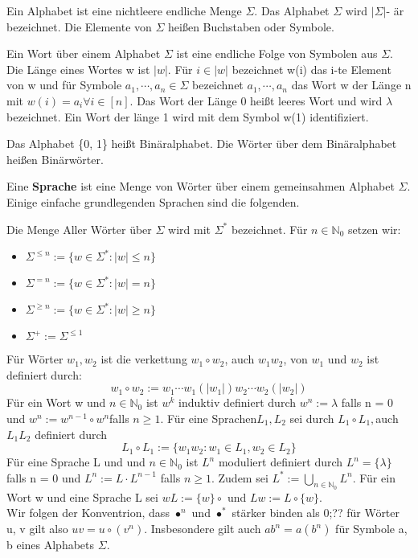     Ein Alphabet ist eine nichtleere endliche Menge \(\Sigma\). Das Alphabet \(\Sigma\) wird \(\lvert \Sigma \rvert\)- är bezeichnet. Die Elemente von \(\Sigma\) heißen Buchstaben oder Symbole.

    Ein Wort über einem Alphabet \(\Sigma\) ist eine endliche Folge von Symbolen aus \(\Sigma\). Die Länge eines Wortes w ist \(\lvert w \rvert\). Für \(i \in\lvert w \rvert\) bezeichnet w(i) das i-te Element von w und für Symbole \(a_{1}, \cdots, a_{n} \in \Sigma\) bezeichnet \(a_{1}, \cdots, a_{n}\) das Wort w der Länge n mit \(w(i) = a_{i} \forall i\in [n]\). Das Wort der Länge 0 heißt leeres Wort und wird \(\lambda\) bezeichnet. Ein Wort der länge 1 wird mit dem Symbol w(1) identifiziert.

    Das Alphabet \{0, 1\} heißt Binäralphabet. Die Wörter über dem Binäralphabet heißen Binärwörter.

    Eine \textbf{Sprache} ist eine Menge von Wörter über einem gemeinsahmen Alphabet \(\Sigma\). Einige einfache grundlegenden Sprachen sind die folgenden.

    Die Menge Aller Wörter über \(\Sigma\) wird mit \(\Sigma^{*}\) bezeichnet. Für \(n \in \mathbb{N}_{0}\) setzen wir:
    \begin{itemize}
        \item[] \(\Sigma^{\leq n} := \{w \in \Sigma^{*} : \lvert w \rvert \leq n\}\)
        \item[] \(\Sigma^{=n} := \{w \in \Sigma^{*} : \lvert w \rvert = n\}\)
        \item[] \(\Sigma^{\geq n} := \{w \in \Sigma^{*} : \lvert w \rvert \geq n\}\)
        \item[] \(\Sigma^{+} := \Sigma^{\leq 1}\)
    \end{itemize}

    Für Wörter \(w_{1}, w_{2}\) ist die verkettung  \(w_{1} \circ w_{2}\), auch \(w_{1}w_{2}\), von \(w_{1}\) und \(w_{2}\) ist definiert durch:
    \[
        w_{1} \circ w_{2} := w_{1} \cdots w_{1} (\lvert w_{1} \rvert)w_{2} \cdots w_{2} (\lvert w_{2} \rvert)
    \]
    Für ein Wort w und \(n \in \mathbb{N}_{0}\) ist \(w^{k}\) induktiv definiert durch \(w^{n} := \lambda \) falls n = 0 und \(w^{n} := w^{n-1} \circ w^{n} \)falls \(n \geq  1\). Für eine Sprachen\( L_{1}, L_{2}\) sei durch \(L_{1} \circ L_{1}, \)auch \(L_{1}L_{2}\) definiert durch
    \[
        L_{1} \circ L_{1} := \{w_{1}w_{2} : w_{1} \in L_{1}, w_{2} \in L_{2}\}
    \]
    Für eine Sprache L und und \(n \in\mathbb{N}_{0}\) ist \(L^{n}\) moduliert definiert durch \(L^{n} = \{\lambda\} \)falls n = 0 und \(L^{n} := L \cdot L^{n - 1}\) falls \(n \geq 1\). Zudem sei \(L^{*} := \bigcup \limits_{n \in \mathbb{N}_{0}}L^{n}\). Für ein Wort w und eine Sprache L sei \(wL :=\{w\}\circ\) und \(Lw := L\circ \{w\}\).\\Wir folgen der Konventrion, dass \(\bullet^{n}\) und \(\bullet^{*}\) stärker binden als 0;?? für Wörter u, v gilt also \(uv = u \circ (v^{n})\). Insbesondere gilt auch \(ab^{n} = a(b^{n})\) für Symbole a, b eines Alphabets \(\Sigma\).

